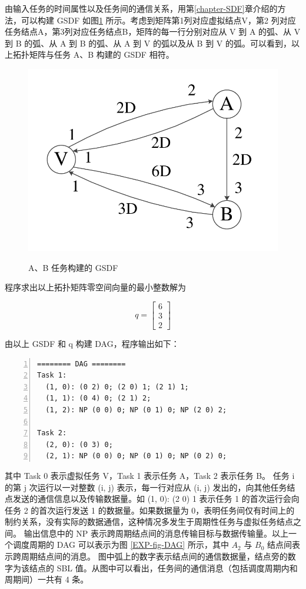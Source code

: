 由输入任务的时间属性以及任务间的通信关系，用第\ref{chapter-SDF}章介绍的方法，可以构建 GSDF 如图\ref{EXP-fig-GSDF} 所示。考虑到矩阵第1列对应虚拟结点V，第2 列对应任务结点A，第3列对应任务结点B，矩阵的每一行分别对应从 V 到 A 的弧、从 V 到 B 的弧、从 A 到 B 的弧、从 A 到 V 的弧以及从 B 到 V 的弧。可以看到，以上拓扑矩阵与任务 A、B 构建的 GSDF 相符。

\begin{figure}[!hbt]
  \centering
  \includegraphics[height=20ex]{figure/EXP-GSDF.pdf}\\
  \caption{A、B 任务构建的 GSDF}\label{EXP-fig-GSDF}
\end{figure}

程序求出以上拓扑矩阵零空间向量的最小整数解为

\begin{equation*}
  q=\begin{bmatrix}
    6 \\
    3 \\
    2
  \end{bmatrix}
\end{equation*}

由以上 GSDF 和 q 构建 DAG，程序输出如下：
\begin{Verbatim}[numbers=left,frame=single,xleftmargin=50pt,
samepage=true,fontsize=\small,baselinestretch=1.2]
======== DAG ========
Task 1:
  (1, 0): (0 2) 0; (2 0) 1; (2 1) 1;
  (1, 1): (0 4) 0; (2 1) 2;
  (1, 2): NP (0 0) 0; NP (0 1) 0; NP (2 0) 2;

Task 2:
  (2, 0): (0 3) 0;
  (2, 1): NP (0 0) 0; NP (0 1) 0; NP (0 2) 0;
\end{Verbatim}

其中 Task 0 表示虚拟任务 V，Task 1 表示任务 A，Task 2 表示任务 B。 任务 i 的第 j 次运行以一对整数 (i, j) 表示，每一行对应从 (i, j) 发出的，向其他任务结点发送的通信信息以及传输数据量。如 (1, 0): (2 0) 1 表示任务 1 的首次运行会向任务 2 的首次运行发送 1 的数据量。如果数据量为 0，表明任务间仅有时间上的制约关系，没有实际的数据通信，这种情况多发生于周期性任务与虚拟任务结点之间。
输出信息中的 NP 表示跨周期结点间的消息传输目标与数据传输量。以上一个调度周期的 DAG 可以表示为图 \ref{EXP-fig-DAG} 所示，其中 $A_2$ 与 $B_0$ 结点间表示跨周期结点间的消息。 图中弧上的数字表示结点间的通信数据量，结点旁的数字为该结点的 SBL 值。从图中可以看出，任务间的通信消息（包括调度周期内和周期间）一共有 4 条。

